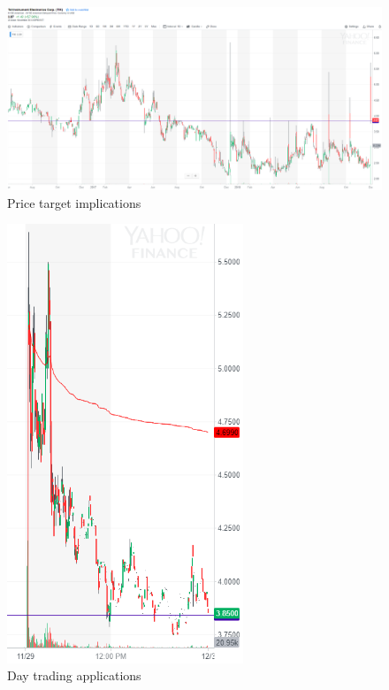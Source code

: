 \documentclass{article}
\begin{document}
\vspace{10pt}

\begin{figure}[!htb]
    \centering
    \includegraphics[width=\textwidth]{imgs/40.png}
    \caption{Price target implications}
\end{figure}

\vspace{10pt}

\begin{figure}[!htb]
    \centering
    \includegraphics[width=200pt]{imgs/41.png}
    \caption{Day trading applications}
\end{figure}

\vspace{10pt}
\end{document}
